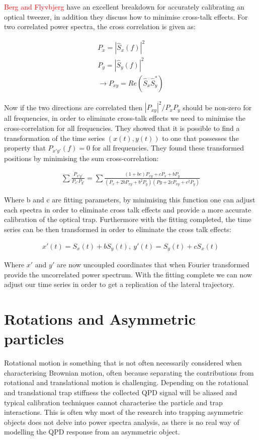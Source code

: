 \textcolor{red}{Berg and Flyvbjerg} have an excellent breakdown for accurately calibrating an optical tweezer, in addition they discuss how to minimise cross-talk effects. For two correlated power spectra, the cross correlation is given as:

\begin{align}
	P_{x} = |\hat{S}_x(f)|^2 \\ 
	P_{y} = |\hat{S}_y(f)|^2 \\
	\rightarrow P_{xy} = Re(\hat{S}_x\hat{S}^*_y)
\end{align}

Now if the two directions are correlated then $|P_{xy}|^2/P_xP_y$  should be non-zero for all frequencies, in order to eliminate cross-talk effects we need to minimise the cross-correlation for all frequencies. They showed that it is possible to find a transformation of the time series $(x(t), y(t))$  to one that possesses the property that $P_{x'y'}(f)=0$ for all frequencies. They found these transformed positions by minimising the sum cross-correlation:

\begin{align}
	\sum\frac{P_{x'y'}}{P_{x'}P_{y'}} = \sum\frac{(1+bc)P_{xy}+cP_x+bP_y}{(P_x+2bP_{xy}+b^2P_y)(Py+2cP_{xy}+c^2P_y)}
\end{align}

Where b and c are fitting parameters, by minimising this function one can adjust each spectra in order to eliminate cross talk effects and provide a more accurate calibration of the optical trap. Furthermore with the fitting completed, the time series can be then transformed in order to eliminate the cross talk effects:

\begin{align}
	x'(t) = S_x(t) + bS_y(t),\ y'(t) = S_y(t) + cS_x(t)
\end{align}

Where $x'$ and $y'$ are now uncoupled coordinates that when Fourier transformed provide the uncorrelated power spectrum. With the fitting complete we can now adjust our time series in order to get a replication of the lateral trajectory. 

\section{Rotations and Asymmetric particles}
Rotational motion is something that is not often necessarily considered when characterising Brownian motion, often because separating the contributions from rotational and translational motion is challenging. Depending on the rotational and translational trap stiffness the collected QPD signal will be aliased and typical calibration techniques cannot characterise the particle and trap interactions. This is often why most of the research into trapping asymmetric objects does not delve into power spectra analysis, as there is no real way of modelling the QPD response from an asymmetric object. 

